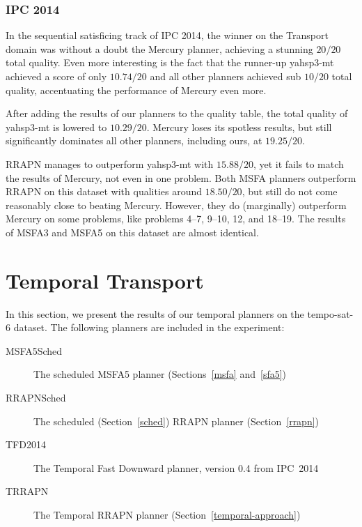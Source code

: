 \subsubsection{IPC 2014}

In the sequential satisficing track of IPC 2014, the winner on the Transport domain
was without a doubt the Mercury planner, achieving
a stunning $20/20$ total quality. Even more interesting is the fact that
the runner-up yahsp3-mt achieved a score of only $10.74/20$
and all other planners achieved sub $10/20$ total quality,
accentuating the performance of Mercury even more.

After adding the results of our planners to the quality table,
the total quality of yahsp3-mt is lowered to $10.29/20$.
Mercury loses its spotless results, but still significantly dominates all
other planners, including ours, at $19.25/20$.

RRAPN manages to outperform yahsp3-mt with $15.88/20$, yet it fails
to match the results of Mercury, not even in one problem.
Both MSFA planners outperform RRAPN on this dataset with qualities around $18.50/20$,
but still do not come reasonably close to beating Mercury.
However, they do (marginally) outperform Mercury on some problems, like
problems 4--7, 9--10, 12, and 18--19.
The results of MSFA3 and MSFA5 on this dataset are almost identical.

















\section{Temporal Transport}

In this section, we present the results of our temporal planners on the tempo-sat-6 dataset. The following planners are included in the experiment:
\begin{description}
\item[MSFA5Sched] The scheduled MSFA5 planner (Sections~\ref{msfa} and~\ref{sfa5})
\item[RRAPNSched] The scheduled (Section~\ref{sched}) RRAPN planner (Section~\ref{rrapn})
\item[TFD2014] The Temporal Fast Downward planner, version 0.4 from IPC~2014 \citep[Preferring Preferred Operators in Temporal Fast Downward]{Vallati2015}
\item[TRRAPN] The Temporal RRAPN planner (Section~\ref{temporal-approach})
\end{description}

